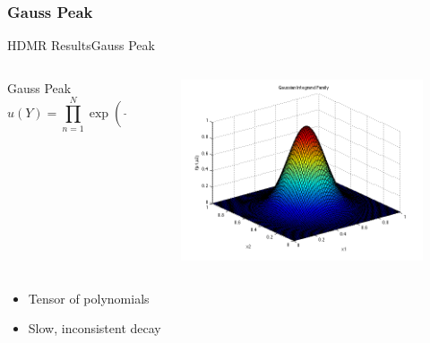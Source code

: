 \documentclass{beamer}
\begin{document}
\subsubsection{Gauss Peak}
\begin{frame}{HDMR Results}{Gauss Peak}\vspace{-20pt}
  \begin{columns}
    \begin{column}{0.6\textwidth}
      \begin{block}{Gauss Peak}
        \[u(Y) = \prod_{n=1}^N \exp(-3^2(y_n-0.5)^2)\]
      \end{block}
    \end{column}
    \begin{column}{0.4\textwidth}
        \begin{figure}[h!]
          \centering
          \includegraphics[width=\linewidth]{anlmodels/gaussian}
        \end{figure}
    \end{column}
  \end{columns}
  \begin{itemize}
    \item Tensor of polynomials
    \item Slow, inconsistent decay
  \end{itemize}
\end{frame}
\end{document}
